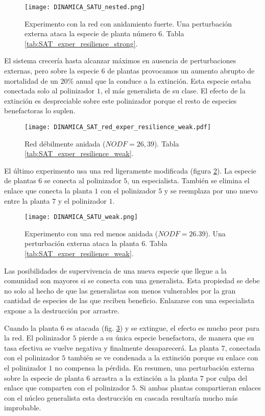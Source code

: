 \begin{figure}[h!]
\centering
\texttt{[image: DINAMICA\_SATU\_nested.png]}
\caption {Experimento con la red con anidamiento fuerte. Una perturbación externa ataca la especie de planta número $6$. Tabla \ref{tab:SAT_exper_resilience_strong}.}
\label{fig:DINAMICA_SAT_exper_resilience_strong}
\end{figure}

El sistema crecería hasta alcanzar máximos en ausencia de perturbaciones externas, pero sobre la especie $6$ de plantas provocamos un aumento abrupto de mortalidad de un $20\%$ anual que la conduce a la extinción. Esta especie estaba conectada solo al polinizador $1$, el más generalista de su clase. El efecto de la extinción es despreciable sobre este polinizador porque el resto de especies benefactoras lo suplen. 

\begin{figure}[h!]
\centering
\texttt{[image: DINAMICA\_SAT\_red\_exper\_resilience\_weak.pdf]}
\caption {Red débilmente anidada  ($NODF = 26,39$). Tabla \ref{tab:SAT_exper_resilience_weak}.}
\label{fig:DINAMICA_SAT_red_exper_resilience_weak}
\end{figure}

El último experimento usa una red ligeramente modificada (figura  \ref{fig:DINAMICA_SAT_red_exper_resilience_weak}). La especie de plantas $6$ se conecta al polinizador $5$, un especialista. También se elimina el enlace que conecta la planta $1$ con el polinizador $5$ y se reemplaza por uno nuevo entre la planta $7$ y el polinizador $1$.  

\begin{figure}[ht!]
\centering
\texttt{[image: DINAMICA\_SATU\_weak.png]}
\caption {Experimento con una red menos anidada ($NODF = 26.39$). Una perturbación externa ataca la planta $6$. Tabla \ref{tab:SAT_exper_resilience_weak}.}
\label{fig:DINAMICA_SATU_weak}
\end{figure}

Las posibilidades de supervivencia de una nueva especie que llegue a la comunidad son mayores si se conecta con una generalista. Esta propiedad se debe no solo al hecho de que las generalistas son menos vulnerables por la gran cantidad de especies de las que reciben beneficio. Enlazarse con una especialista expone a la destrucción por arrastre.

Cuando la planta $6$ es atacada (fig. \ref{fig:DINAMICA_SATU_weak}) y se extingue, el efecto es mucho peor para la red. El polinizador $5$ pierde a su única especie benefactora, de manera que su tasa efectiva se vuelve negativa y finalmente desaparecerá. La planta $7$, conectada con el polinizador $5$ también se ve condenada a la extinción porque su enlace con el polinizador $1$ no compensa la pérdida. En resumen, una perturbación externa sobre la especie de planta $6$ arrastra a la extinción a la planta $7$ por culpa del enlace que comparten con el polinizador $5$. Si ambas plantas compartieran enlaces con el núcleo generalista esta destrucción en cascada resultaría mucho más improbable.


